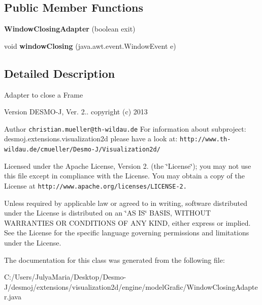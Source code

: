 \subsection*{Public Member Functions}
\begin{DoxyCompactItemize}
\item 
{\bfseries Window\-Closing\-Adapter} (boolean exit)\label{classdesmoj_1_1extensions_1_1visualization2d_1_1engine_1_1model_grafic_1_1_window_closing_adapter_af209c522c4b961c2e2cb0b486076ee56}

\item 
void {\bfseries window\-Closing} (java.\-awt.\-event.\-Window\-Event e)\label{classdesmoj_1_1extensions_1_1visualization2d_1_1engine_1_1model_grafic_1_1_window_closing_adapter_a11927a9587fe0a524f4a36b4c1bfdbac}

\end{DoxyCompactItemize}


\subsection{Detailed Description}
Adapter to close a Frame

\begin{DoxyVersion}{Version}
D\-E\-S\-M\-O-\/\-J, Ver. 2.. copyright (c) 2013 
\end{DoxyVersion}
\begin{DoxyAuthor}{Author}
{\tt christian.\-mueller@th-\/wildau.\-de} For information about subproject\-: desmoj.\-extensions.\-visualization2d please have a look at\-: {\tt http\-://www.\-th-\/wildau.\-de/cmueller/\-Desmo-\/\-J/\-Visualization2d/}
\end{DoxyAuthor}
Licensed under the Apache License, Version 2. (the \char`\"{}\-License\char`\"{}); you may not use this file except in compliance with the License. You may obtain a copy of the License at {\tt http\-://www.\-apache.\-org/licenses/\-L\-I\-C\-E\-N\-S\-E-\/2.}

Unless required by applicable law or agreed to in writing, software distributed under the License is distributed on an \char`\"{}\-A\-S I\-S\char`\"{} B\-A\-S\-I\-S, W\-I\-T\-H\-O\-U\-T W\-A\-R\-R\-A\-N\-T\-I\-E\-S O\-R C\-O\-N\-D\-I\-T\-I\-O\-N\-S O\-F A\-N\-Y K\-I\-N\-D, either express or implied. See the License for the specific language governing permissions and limitations under the License. 

The documentation for this class was generated from the following file\-:\begin{DoxyCompactItemize}
\item 
C\-:/\-Users/\-Julya\-Maria/\-Desktop/\-Desmo-\/\-J/desmoj/extensions/visualization2d/engine/model\-Grafic/Window\-Closing\-Adapter.\-java\end{DoxyCompactItemize}
